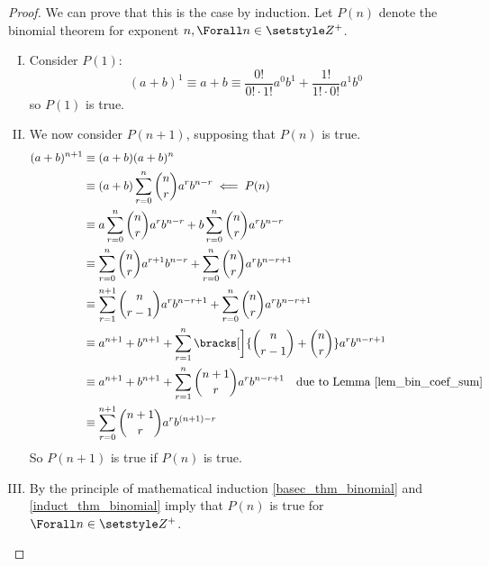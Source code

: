 \begin{proof}
 We can prove that this is the case by induction. Let \(P(n)\) denote the
 binomial theorem for exponent \(n, \Forall n \in \Integers^+\).
 \begin{enumerate}[I.]
  \item \label{basec_thm_binomial} Consider \(P(1)\):
        \begin{equation*}
        (a + b)^1 \equiv a + b
            \equiv \frac{0!}{0!\cdot 1!} a^0b^1 +
                \frac{1!}{1!\cdot 0!} a^1b^0
        \end{equation*}
        so \(P(1)\) is true.
  \item \label{induct_thm_binomial} We now consider \(P(n + 1)\), supposing
        that \(P(n)\) is true.
        \begin{align*}
        (a + b)^{n + 1} &\equiv (a + b)(a + b)^n \\
            &\equiv (a + b)\sum_{r = 0}^n \binom nr a^r b^{n - r}
                \impliedby P(n) \\
            &\equiv a\sum_{r = 0}^n \binom nr a^r b^{n - r}
                + b\sum_{r = 0}^n \binom nr a^r b^{n - r} \\
            &\equiv \sum_{r = 0}^n \binom nr a^{r + 1} b^{n - r}
                + \sum_{r = 0}^n \binom nr a^r b^{n - r + 1} \\
            &\equiv \sum_{r = 1}^{n + 1} \binom n{r - 1} a^r b^{n - r + 1}
                + \sum_{r = 0}^n \binom nr a^r b^{n - r + 1} \\
            &\equiv a^{n + 1} + b^{n + 1}
                + \sum_{r = 1}^n
                      \bracks[\bigg]{\binom n{r - 1} + \binom nr}
                    a^r b^{n - r + 1} \\
            &\equiv a^{n + 1} + b^{n + 1}
                + \sum_{r = 1}^n \binom{n + 1}r a^r b^{n - r + 1}
                    \quad \text{due to Lemma \ref{lem_bin_coef_sum}} \\
            &\equiv \sum_{r = 0}^{n + 1}
                  \binom{n + 1}r a^r b^{(n + 1) - r}
        \end{align*}
        So \(P(n + 1)\) is true if \(P(n)\) is true.
  \item By the principle of mathematical induction
        \ref{basec_thm_binomial} and \ref{induct_thm_binomial} imply
        that \(P(n)\) is true for \(\Forall n \in \Integers^+\). \qedhere
 \end{enumerate}
\end{proof}

